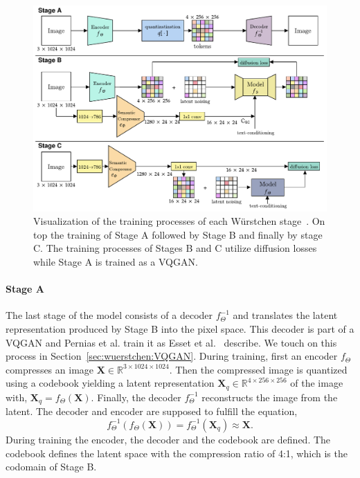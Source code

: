 \begin{figure}[t]
    \includegraphics[width=\textwidth]{assets/wuerstchen_training.pdf}
    \caption{Visualization of the training processes of each W\"urstchen stage~\cite{pernias2024wrstchen}.
        On top the training of Stage A followed by Stage B and finally by stage C.
        The training processes of Stages B and C utilize diffusion losses while
        Stage A is trained as a VQGAN.}
    \label{fig:wuerstchen:training}
\end{figure}

\paragraph*{Stage A} The last stage of the model consists of a decoder
$f_{\Theta}^{-1}$ and translates the latent representation produced by Stage B into
the pixel space. This decoder is part of a VQGAN and Pernias et al. train it as
Esset et al.~\cite{esser2021tamingtransformershighresolutionimage} describe.
We touch on this process in Section~\ref{sec:wuerstchen:VQGAN}. During training,
first an encoder $f_{\Theta}$ compresses an image $\boldsymbol{X}\in\mathbb{R}^{3\times1024\times1024}$. Then the compressed image is
quantized using a codebook yielding a latent representation $\boldsymbol{X}_q\in\mathbb{R}^{4\times256\times256}$ of the image with,
$\boldsymbol{X}_q = f_{\Theta}(\boldsymbol{X}).$
Finally, the decoder $f_{\Theta}^{-1}$ reconstructs the image from the latent.
The decoder and encoder are supposed to fulfill the equation,
\begin{equation}
    f_{\Theta}^{-1}(f_{\Theta}(\boldsymbol{X})) = f_{\Theta}^{-1}(\boldsymbol{X}_q) \approx \boldsymbol{X}.
\end{equation}
During training the encoder, the decoder and the codebook are defined. The
codebook defines the latent space with the compression ratio of 4:1, which is
the codomain of Stage B.

